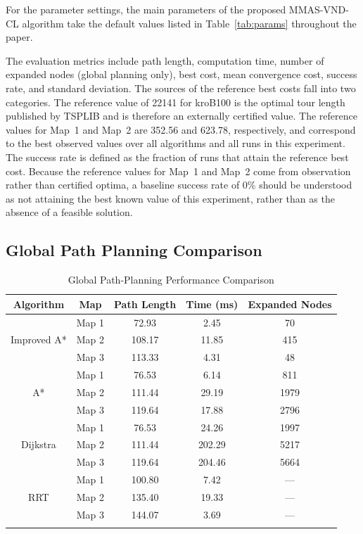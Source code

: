 \documentclass[pdflatex,sn-basic,Numbered]{sn-jnl}
\begin{document}
For the parameter settings, the main parameters of the proposed MMAS-VND-CL algorithm take the default values listed in Table~\ref{tab:params} throughout the paper.

The evaluation metrics include path length, computation time, number of expanded nodes (global planning only), best cost, mean convergence cost, success rate, and standard deviation. The sources of the reference best costs fall into two categories. The reference value of 22141 for kroB100 is the optimal tour length published by TSPLIB and is therefore an externally certified value. The reference values for Map~1 and Map~2 are 352.56 and 623.78, respectively, and correspond to the best observed values over all algorithms and all runs in this experiment. The success rate is defined as the fraction of runs that attain the reference best cost. Because the reference values for Map~1 and Map~2 come from observation rather than certified optima, a baseline success rate of 0\% should be understood as not attaining the best known value of this experiment, rather than as the absence of a feasible solution.

\subsection{Global Path Planning Comparison}
\label{subsec:exp_plan}

\begin{table}[!ht]
\caption{Global Path-Planning Performance Comparison}
\label{tab:plan}
\centering
\footnotesize
\setlength{\tabcolsep}{4pt}
\begin{tabular}{ccccc}
\toprule
Algorithm & Map & Path Length & Time (ms) & Expanded Nodes \\
\midrule
\multirow{3}{*}{Improved A*}
& Map 1 & 72.93 & 2.45 & 70 \\
& Map 2 & 108.17 & 11.85 & 415 \\
& Map 3 & 113.33 & 4.31 & 48 \\
\midrule
\multirow{3}{*}{A*}
& Map 1 & 76.53 & 6.14 & 811 \\
& Map 2 & 111.44 & 29.19 & 1979 \\
& Map 3 & 119.64 & 17.88 & 2796 \\
\midrule
\multirow{3}{*}{Dijkstra}
& Map 1 & 76.53 & 24.26 & 1997 \\
& Map 2 & 111.44 & 202.29 & 5217 \\
& Map 3 & 119.64 & 204.46 & 5664 \\
\midrule
\multirow{3}{*}{RRT}
& Map 1 & 100.80 & 7.42 & --- \\
& Map 2 & 135.40 & 19.33 & --- \\
& Map 3 & 144.07 & 3.69 & --- \\
\botrule
\end{tabular}
\end{table}
\end{document}
